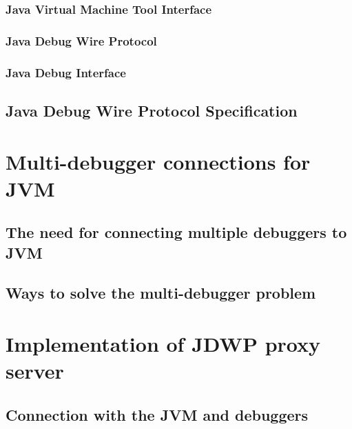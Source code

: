 \documentclass{style/bachelor-thesis}
\begin{document}
\subsubsection{Java Virtual Machine Tool Interface}
\label{sec:jvmti}


\subsubsection{Java Debug Wire Protocol}
\label{sec:jdwp}


\subsubsection{Java Debug Interface}
\label{sec:jdi}


\subsection{Java Debug Wire Protocol Specification}
\label{sec:jdwp_spec}



\pagebreak

\section{Multi-debugger connections for JVM}
\label{sec:proxy}


\subsection{The need for connecting multiple debuggers to JVM}
\label{sec:need_for_proxy}


\subsection{Ways to solve the multi-debugger problem}
\label{sec:proxy_solutions}


\pagebreak

\section{Implementation of JDWP proxy server}
\label{sec:implementation}


\subsection{Connection with the JVM and debuggers}
\label{sec:impl_connection}

\end{document}
